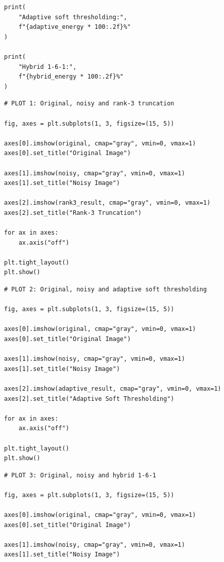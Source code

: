 \documentclass{article}
\begin{document}
\begin{flushleft}
\begin{lstlisting}[caption={Calculating and printing MSE, PSNR and energy retention}]
print(
    "Adaptive soft thresholding:",
    f"{adaptive_energy * 100:.2f}%"
)

print(
    "Hybrid 1-6-1:",
    f"{hybrid_energy * 100:.2f}%"
)
\end{lstlisting}

\begin{lstlisting}[caption={Plotting original, noisy and rank-3 truncated images}]
# PLOT 1: Original, noisy and rank-3 truncation

fig, axes = plt.subplots(1, 3, figsize=(15, 5))

axes[0].imshow(original, cmap="gray", vmin=0, vmax=1)
axes[0].set_title("Original Image")

axes[1].imshow(noisy, cmap="gray", vmin=0, vmax=1)
axes[1].set_title("Noisy Image")

axes[2].imshow(rank3_result, cmap="gray", vmin=0, vmax=1)
axes[2].set_title("Rank-3 Truncation")

for ax in axes:
    ax.axis("off")

plt.tight_layout()
plt.show()
\end{lstlisting}

\begin{lstlisting}[caption={Plotting original, noisy and adaptive soft-thresholded images}]
# PLOT 2: Original, noisy and adaptive soft thresholding

fig, axes = plt.subplots(1, 3, figsize=(15, 5))

axes[0].imshow(original, cmap="gray", vmin=0, vmax=1)
axes[0].set_title("Original Image")

axes[1].imshow(noisy, cmap="gray", vmin=0, vmax=1)
axes[1].set_title("Noisy Image")

axes[2].imshow(adaptive_result, cmap="gray", vmin=0, vmax=1)
axes[2].set_title("Adaptive Soft Thresholding")

for ax in axes:
    ax.axis("off")

plt.tight_layout()
plt.show()
\end{lstlisting}

\begin{lstlisting}[caption={Plotting original, noisy and hybrid 1-6-1 images}]
# PLOT 3: Original, noisy and hybrid 1-6-1

fig, axes = plt.subplots(1, 3, figsize=(15, 5))

axes[0].imshow(original, cmap="gray", vmin=0, vmax=1)
axes[0].set_title("Original Image")

axes[1].imshow(noisy, cmap="gray", vmin=0, vmax=1)
axes[1].set_title("Noisy Image")


\end{lstlisting}
\end{flushleft}
\end{document}
